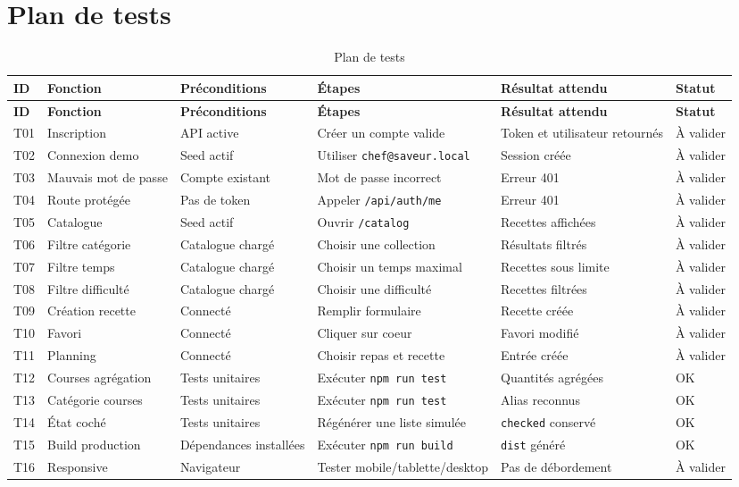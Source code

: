 \documentclass[12pt,a4paper]{report}
\begin{document}
\section{Plan de tests}
\begin{longtable}{p{0.9cm}p{2.1cm}p{2.5cm}p{3.9cm}p{2.8cm}p{1.5cm}}
\caption{Plan de tests}\label{tab:tests}\\
\toprule
\textbf{ID} & \textbf{Fonction} & \textbf{Préconditions} & \textbf{Étapes} & \textbf{Résultat attendu} & \textbf{Statut} \\
\midrule
\endfirsthead
\toprule
\textbf{ID} & \textbf{Fonction} & \textbf{Préconditions} & \textbf{Étapes} & \textbf{Résultat attendu} & \textbf{Statut} \\
\midrule
\endhead
T01 & Inscription & API active & Créer un compte valide & Token et utilisateur retournés & À valider \\
T02 & Connexion demo & Seed actif & Utiliser \texttt{chef@saveur.local} & Session créée & À valider \\
T03 & Mauvais mot de passe & Compte existant & Mot de passe incorrect & Erreur 401 & À valider \\
T04 & Route protégée & Pas de token & Appeler \texttt{/api/auth/me} & Erreur 401 & À valider \\
T05 & Catalogue & Seed actif & Ouvrir \texttt{/catalog} & Recettes affichées & À valider \\
T06 & Filtre catégorie & Catalogue chargé & Choisir une collection & Résultats filtrés & À valider \\
T07 & Filtre temps & Catalogue chargé & Choisir un temps maximal & Recettes sous limite & À valider \\
T08 & Filtre difficulté & Catalogue chargé & Choisir une difficulté & Recettes filtrées & À valider \\
T09 & Création recette & Connecté & Remplir formulaire & Recette créée & À valider \\
T10 & Favori & Connecté & Cliquer sur coeur & Favori modifié & À valider \\
T11 & Planning & Connecté & Choisir repas et recette & Entrée créée & À valider \\
T12 & Courses agrégation & Tests unitaires & Exécuter \texttt{npm run test} & Quantités agrégées & OK \\
T13 & Catégorie courses & Tests unitaires & Exécuter \texttt{npm run test} & Alias reconnus & OK \\
T14 & État coché & Tests unitaires & Régénérer une liste simulée & \texttt{checked} conservé & OK \\
T15 & Build production & Dépendances installées & Exécuter \texttt{npm run build} & \texttt{dist} généré & OK \\
T16 & Responsive & Navigateur & Tester mobile/tablette/desktop & Pas de débordement & À valider \\
\bottomrule
\end{longtable}
\end{document}
